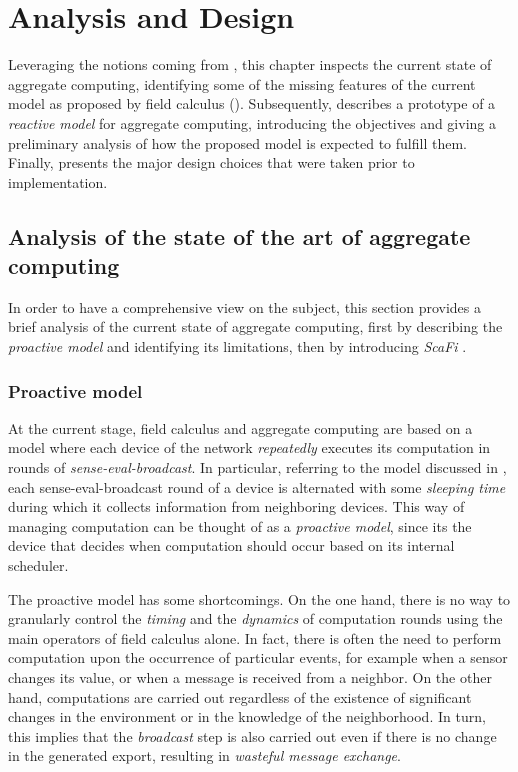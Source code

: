 \chapter{Analysis and Design}
\label{chap:analysis-design}

Leveraging the notions coming from , this chapter inspects the current state of aggregate computing, identifying some of the missing features of the current model as proposed by field calculus ().
%
Subsequently,  describes a prototype of a \textit{reactive model} for aggregate computing, introducing the objectives and giving a preliminary analysis of how the proposed model is expected to fulfill them.
%
Finally,  presents the major design choices that were taken prior to implementation.

\section{Analysis of the state of the art of aggregate computing}
\label{sec:current-state}

In order to have a comprehensive view on the subject, this section provides a brief analysis of the current state of aggregate computing, first by describing the \textit{proactive model} and identifying its limitations, then by introducing \textit{ScaFi} \cite{CASADEI2022101248}.

\subsection{Proactive model}

At the current stage, field calculus and aggregate computing are based on a model where each device of the network \textit{repeatedly} executes its computation in rounds of \textit{sense-eval-broadcast}.
%
In particular, referring to the model discussed in \cite{10.1145/3177774}, each sense-eval-broadcast round of a device is alternated with some \textit{sleeping time} during which it collects information from neighboring devices.
%
This way of managing computation can be thought of as a \textit{proactive model}, since its the device that decides when computation should occur based on its internal scheduler.

The proactive model has some shortcomings.
%
On the one hand, there is no way to granularly control the \textit{timing} and the \textit{dynamics} of computation rounds using the main operators of field calculus alone.
%
In fact, there is often the need to perform computation upon the occurrence of particular events, for example when a sensor changes its value, or when a message is received from a neighbor.
%
On the other hand, computations are carried out regardless of the existence of significant changes in the environment or in the knowledge of the neighborhood.
%
In turn, this implies that the \textit{broadcast} step is also carried out even if there is no change in the generated export, resulting in \textit{wasteful message exchange}.

